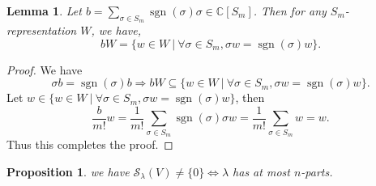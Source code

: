 \documentclass[10pt]{article}
\newtheorem{proposition}{Proposition}[section]
\newtheorem{lemma}{Lemma}[section]
\numberwithin{equation}{theorem}
\DeclareMathOperator{\sgn}{sgn}
\newcommand{\C}[0]{\mathbb{C}}
\newcommand{\sep}[0]{\:|\:}
\begin{document}
  \begin{lemma}
    Let $b = \sum_{\sigma\in S_m}\sgn(\sigma)\sigma\in\C[S_m]$. Then for any $S_m$-representation $W$, we have,
    \begin{equation*}
      bW = \{w\in W\sep \forall \sigma\in S_m, \sigma w = \sgn(\sigma)w\}.
    \end{equation*}
    \label{proposition_48_claim_1}
  \end{lemma}
  \begin{proof}
    We have 
    \begin{equation*}
    \sigma b = \sgn(\sigma)b \Rightarrow bW \subseteq \{w\in W\sep \forall \sigma\in S_m, \sigma w = \sgn(\sigma)w\}.
    \end{equation*}
    Let $w\in\{w\in W\sep \forall \sigma\in S_m, \sigma w = \sgn(\sigma)w\}$, then 
    \begin{equation*}
      {\frac b {m!}}w = {\frac 1 {m!}}\sum_{\sigma\in S_m}\sgn(\sigma)\sigma w = {\frac 1 {m!}}\sum_{\sigma\in S_m}w = w.
    \end{equation*}
    Thus this completes the proof.
  \end{proof}
\begin{proposition}
  \label{proposition_48}
  we have $\mathcal{S}_\lambda(V)\not=\{0\}\Leftrightarrow\lambda$ has at most $n$-parts.
\end{proposition}
\end{document}
